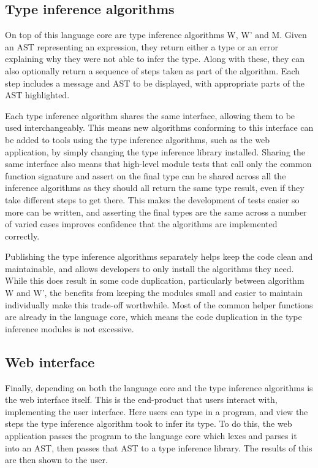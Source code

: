 \documentclass[a4paper,fleqn,twoside,12pt]{report}
\begin{document}
\subsection{Type inference algorithms}\label{id:h.75leuokwbltp}
On top of this language core are type inference algorithms W, W’ and M. Given an AST representing an expression, they return either a type or an error explaining why they were not able to infer the type. Along with these, they can also optionally return a sequence of steps taken as part of the algorithm. Each step includes a message and AST to be displayed, with appropriate parts of the AST highlighted.

Each type inference algorithm shares the same interface, allowing them to be used interchangeably. This means new algorithms conforming to this interface can be added to tools using the type inference algorithms, such as the web application, by simply changing the type inference library installed. Sharing the same interface also means that high-level module tests that call only the common function signature and assert on the final type can be shared across all the inference algorithms as they should all return the same type result, even if they take different steps to get there. This makes the development of tests easier so more can be written, and asserting the final types are the same across a number of varied cases improves confidence that the algorithms are implemented correctly.

Publishing the type inference algorithms separately helps keep the code clean and maintainable, and allows developers to only install the algorithms they need. While this does result in some code duplication, particularly between algorithm W and W’, the benefits from keeping the modules small and easier to maintain individually make this trade-off worthwhile. Most of the common helper functions are already in the language core, which means the code duplication in the type inference modules is not excessive.
\subsection{Web interface}\label{id:h.q67ivlz7h61r}
Finally, depending on both the language core and the type inference algorithms is the web interface itself. This is the end-product that users interact with, implementing the user interface. Here users can type in a program, and view the steps the type inference algorithm took to infer its type. To do this, the web application passes the program to the language core which lexes and parses it into an AST, then passes that AST to a type inference library. The results of this are then shown to the user.
\end{document}
